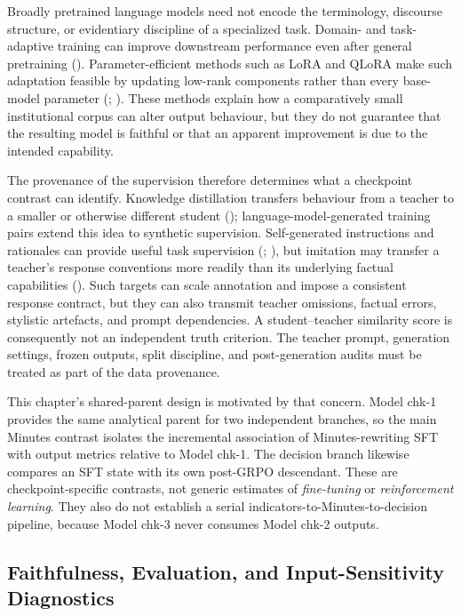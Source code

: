Broadly pretrained language models need not encode the terminology, discourse
structure, or evidentiary discipline of a specialized task. Domain- and
task-adaptive training can improve downstream performance even after general
pretraining (\cite{gururangan2020dont}). Parameter-efficient methods such as
LoRA and QLoRA make such adaptation feasible by updating low-rank components
rather than every base-model parameter (\cite{hu2021lora};
\cite{dettmers2024qlora}). These methods explain how a comparatively small
institutional corpus can alter output behaviour, but they do not guarantee
that the resulting model is faithful or that an apparent improvement is due
to the intended capability.

The provenance of the supervision therefore determines what a checkpoint
contrast can identify. Knowledge
distillation transfers behaviour from a teacher to a smaller or otherwise
different student (\cite{hinton2015distilling}); language-model-generated
training pairs extend this idea to synthetic supervision. Self-generated
instructions and rationales can provide useful task supervision
(\cite{wang2023selfinstruct}; \cite{hsieh2023distilling}), but imitation may
transfer a teacher's response conventions more readily than its underlying
factual capabilities (\cite{gudibande2024false}). Such targets can scale
annotation and impose a consistent response contract, but they can also
transmit teacher omissions, factual errors, stylistic artefacts, and prompt
dependencies. A student--teacher similarity score is consequently not an
independent truth criterion. The teacher prompt, generation settings, frozen
outputs, split discipline, and post-generation audits must be treated as part
of the data provenance.

This chapter's shared-parent design is motivated by that concern. Model chk-1
provides the same analytical parent for two independent branches, so the main
Minutes contrast isolates the incremental association of Minutes-rewriting SFT
with output metrics relative to Model chk-1. The decision branch likewise
compares an SFT state with its own post-GRPO descendant. These are
checkpoint-specific contrasts, not generic estimates of \emph{fine-tuning} or
\emph{reinforcement learning}. They also do not establish a serial
indicators-to-Minutes-to-decision pipeline, because Model chk-3 never consumes
Model chk-2 outputs.

\subsection{Faithfulness, Evaluation, and Input-Sensitivity Diagnostics}
\label{ch2:sec:lr:evaluation}

